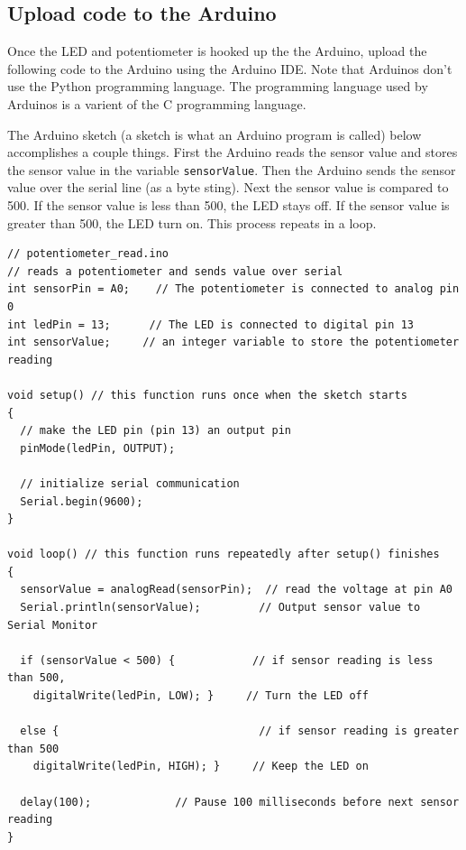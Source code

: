 \documentclass{book}
\begin{document}
    \subsection{Upload code to the
Arduino}\label{upload-code-to-the-arduino}

    Once the LED and potentiometer is hooked up the the Arduino, upload the
following code to the Arduino using the Arduino IDE. Note that Arduinos
don't use the Python programming language. The programming language used
by Arduinos is a varient of the C programming language.

The Arduino sketch (a sketch is what an Arduino program is called) below
accomplishes a couple things. First the Arduino reads the sensor value
and stores the sensor value in the variable \lstinline!sensorValue!.
Then the Arduino sends the sensor value over the serial line (as a byte
sting). Next the sensor value is compared to 500. If the sensor value is
less than 500, the LED stays off. If the sensor value is greater than
500, the LED turn on. This process repeats in a loop.

    \begin{lstlisting}
// potentiometer_read.ino
// reads a potentiometer and sends value over serial
int sensorPin = A0;    // The potentiometer is connected to analog pin 0                  
int ledPin = 13;      // The LED is connected to digital pin 13
int sensorValue;     // an integer variable to store the potentiometer reading

void setup() // this function runs once when the sketch starts
{
  // make the LED pin (pin 13) an output pin
  pinMode(ledPin, OUTPUT);

  // initialize serial communication
  Serial.begin(9600);
}

void loop() // this function runs repeatedly after setup() finishes
{
  sensorValue = analogRead(sensorPin);  // read the voltage at pin A0   
  Serial.println(sensorValue);         // Output sensor value to Serial Monitor
  
  if (sensorValue < 500) {            // if sensor reading is less than 500,
    digitalWrite(ledPin, LOW); }     // Turn the LED off
  
  else {                               // if sensor reading is greater than 500
    digitalWrite(ledPin, HIGH); }     // Keep the LED on
  
  delay(100);             // Pause 100 milliseconds before next sensor reading
}
\end{lstlisting}
\end{document}
